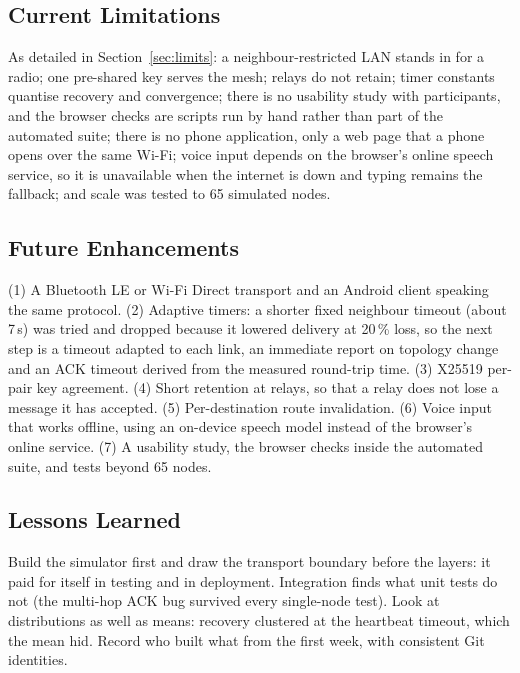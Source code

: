 \subsection{Current Limitations}
As detailed in Section~\ref{sec:limits}: a neighbour-restricted LAN stands in for a radio; one pre-shared key serves the mesh; relays do not retain; timer constants quantise recovery and convergence; there is no usability study with participants, and the browser checks are scripts run by hand rather than part of the automated suite; there is no phone application, only a web page that a phone opens over the same Wi-Fi; voice input depends on the browser's online speech service, so it is unavailable when the internet is down and typing remains the fallback; and scale was tested to 65 simulated nodes.


\subsection{Future Enhancements}
(1) A Bluetooth LE or Wi-Fi Direct transport and an Android client speaking the same protocol. (2) Adaptive timers: a shorter fixed neighbour timeout (about 7\,s) was tried and dropped because it lowered delivery at 20\,\% loss, so the next step is a timeout adapted to each link, an immediate report on topology change and an ACK timeout derived from the measured round-trip time. (3) X25519 per-pair key agreement. (4) Short retention at relays, so that a relay does not lose a message it has accepted. (5) Per-destination route invalidation. (6) Voice input that works offline, using an on-device speech model instead of the browser's online service. (7) A usability study, the browser checks inside the automated suite, and tests beyond 65 nodes.

\subsection{Lessons Learned}
Build the simulator first and draw the transport boundary before the layers: it paid for itself in testing and in deployment. Integration finds what unit tests do not (the multi-hop ACK bug survived every single-node test). Look at distributions as well as means: recovery clustered at the heartbeat timeout, which the mean hid. Record who built what from the first week, with consistent Git identities.


